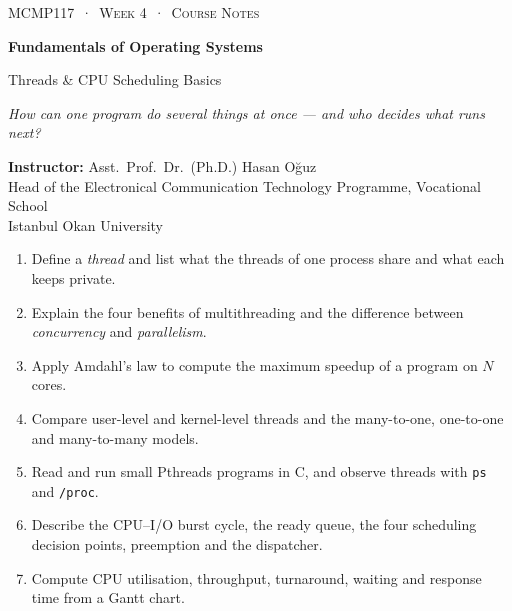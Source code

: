 \documentclass[11pt,a4paper]{article}
\newcommand{\cmd}[1]{\texttt{#1}}
\begin{document}
\thispagestyle{empty}
\begin{tcolorbox}[enhanced,colback=dark,colframe=dark,arc=0pt,boxrule=0pt,
  left=18pt,right=18pt,top=20pt,bottom=20pt,coltext=white]
{\small\color{mint}\textsc{MCMP117 \,·\, Week 4 \,·\, Course Notes}}\par\medskip
{\headfont\fontsize{26}{30}\selectfont\bfseries Fundamentals of Operating Systems}\par\medskip
{\large Threads \& CPU Scheduling Basics}\par\smallskip
{\small\itshape\color{white!70} How can one program do several things at once --- and who decides what runs next?}
\end{tcolorbox}

\vspace{0.4em}
{\small
\textbf{Instructor:} Asst.\ Prof.\ Dr.\ (Ph.D.) Hasan Oğuz\\
Head of the Electronical Communication Technology Programme, Vocational School\\
Istanbul Okan University\par}

\vspace{0.8em}
\begin{keyidea}
\begin{enumerate}[leftmargin=1.4em]
  \item Define a \emph{thread} and list what the threads of one process share and what each keeps private.
  \item Explain the four benefits of multithreading and the difference between \emph{concurrency} and \emph{parallelism}.
  \item Apply Amdahl's law to compute the maximum speedup of a program on $N$ cores.
  \item Compare user-level and kernel-level threads and the many-to-one, one-to-one and many-to-many models.
  \item Read and run small Pthreads programs in C, and observe threads with \cmd{ps} and \cmd{/proc}.
  \item Describe the CPU--I/O burst cycle, the ready queue, the four scheduling decision points, preemption and the dispatcher.
  \item Compute CPU utilisation, throughput, turnaround, waiting and response time from a Gantt chart.
\end{enumerate}
\end{keyidea}
\end{document}
